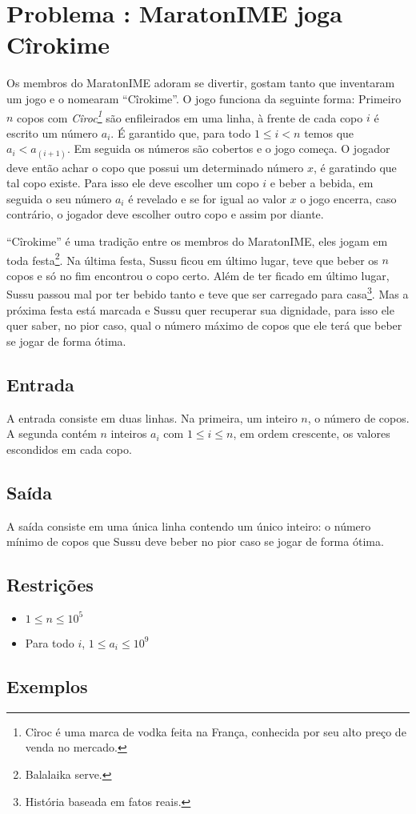 \section*{Problema \proxLetra: MaratonIME joga Cîrokime}

Os membros do MaratonIME adoram se divertir, gostam tanto que inventaram um jogo e o nomearam ``Cîrokime''. O jogo funciona da seguinte forma:\newline 
Primeiro $n$ copos com \textit{Cîroc\footnote{Cîroc é uma marca de vodka feita na França, conhecida por seu alto preço de venda no mercado.}} são enfileirados em uma linha, à frente de cada copo $i$ é escrito um número $a_i$. É garantido que, para todo $ 1 \leq i < n$ temos que $a_i < a_(i + 1)$. Em seguida os números são cobertos e o jogo começa.
O jogador deve então achar o copo que possui um determinado número $x$, é garatindo que tal copo existe. Para isso ele deve escolher um copo $i$ e beber a bebida, em seguida o seu número $a_i$ é revelado e se for igual ao valor $x$ o jogo encerra, caso contrário, o jogador deve escolher outro copo e assim por diante. 

``Cîrokime'' é uma tradição entre os membros do MaratonIME, eles jogam em toda festa\footnote{Balalaika serve.}. Na última festa, Sussu ficou em último lugar, teve que beber os $n$ copos e só no fim encontrou o copo certo. Além de ter ficado em último lugar, Sussu passou mal por ter bebido tanto e teve que ser carregado para casa\footnote{História baseada em fatos reais.}. Mas a próxima festa está marcada e Sussu quer recuperar sua dignidade, para isso ele quer saber, no pior caso, qual o número máximo de copos que ele terá que beber se jogar de forma ótima.

\subsection*{Entrada}

A entrada consiste em duas linhas. Na primeira, um inteiro $n$, o número de copos. A segunda contém $n$ inteiros $a_i$ com $1 \leq i \leq n$, em ordem crescente, os valores escondidos em cada copo.


\subsection*{Saída}

A saída consiste em uma única linha contendo um único inteiro: o número mínimo de copos que Sussu deve beber no pior caso se jogar de forma ótima.


\subsection*{Restrições}
\begin{itemize}
  \item $1 \leq n \leq 10^5$
  \item Para todo $i$, $1 \leq a_i \leq 10^9$
\end{itemize}

\subsection*{Exemplos}

\begin{center}
\end{center}

